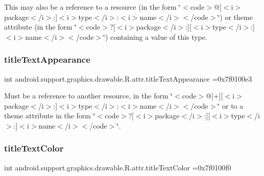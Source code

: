 This may also be a reference to a resource (in the form \char`\"{}$<$code$>$@\mbox{[}$<$i$>$package$<$/i$>$\+:\mbox{]}$<$i$>$type$<$/i$>$\+:$<$i$>$name$<$/i$>$$<$/code$>$\char`\"{}) or theme attribute (in the form \char`\"{}$<$code$>$?\mbox{[}$<$i$>$package$<$/i$>$\+:\mbox{]}\mbox{[}$<$i$>$type$<$/i$>$\+:\mbox{]}$<$i$>$name$<$/i$>$$<$/code$>$\char`\"{}) containing a value of this type. \mbox{\label{classandroid_1_1support_1_1graphics_1_1drawable_1_1R_1_1attr_ab56b26f4ea1f7e5201d89afb5b192937}} 
\subsubsection{\texorpdfstring{title\+Text\+Appearance}{titleTextAppearance}}
{\footnotesize\ttfamily int android.\+support.\+graphics.\+drawable.\+R.\+attr.\+title\+Text\+Appearance =0x7f0100e3\hspace{0.3cm}{\ttfamily [static]}}

Must be a reference to another resource, in the form \char`\"{}$<$code$>$@\mbox{[}+\mbox{]}\mbox{[}$<$i$>$package$<$/i$>$\+:\mbox{]}$<$i$>$type$<$/i$>$\+:$<$i$>$name$<$/i$>$$<$/code$>$\char`\"{} or to a theme attribute in the form \char`\"{}$<$code$>$?\mbox{[}$<$i$>$package$<$/i$>$\+:\mbox{]}\mbox{[}$<$i$>$type$<$/i$>$\+:\mbox{]}$<$i$>$name$<$/i$>$$<$/code$>$\char`\"{}. \mbox{\label{classandroid_1_1support_1_1graphics_1_1drawable_1_1R_1_1attr_ae9392c834deb5e76561b418b5d637222}} 
\subsubsection{\texorpdfstring{title\+Text\+Color}{titleTextColor}}
{\footnotesize\ttfamily int android.\+support.\+graphics.\+drawable.\+R.\+attr.\+title\+Text\+Color =0x7f0100f0\hspace{0.3cm}{\ttfamily [static]}}

